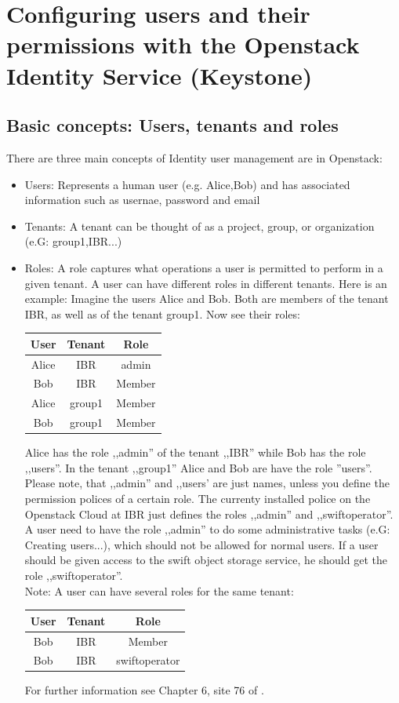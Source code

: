 \documentclass[a4paper,ngerman,bibtotocliststotoc]{scrartcl}
\begin{document}
\section{Configuring users and their permissions with the Openstack
  Identity Service (Keystone)}

\subsection{Basic concepts: Users, tenants and roles}
\label{sec:basic-conc-users}
There are three main concepts of Identity user management are in Openstack:
\begin{itemize}
\item Users: Represents a human user (e.g. Alice,Bob) and has associated
  information such as usernae, password and email
\item Tenants: A tenant can be thought of as a project, group, or
  organization (e.G: group1,IBR...) 
\item Roles: A role captures what operations a user is permitted to
  perform in a given tenant.  A user can have different roles in
  different tenants. Here is an example: Imagine the users Alice and
  Bob. Both are members of the tenant IBR, as well as of the tenant
  group1. Now see their roles:\\
  \begin{center}
  \begin{tabular}{c|c|c}
    User & Tenant & Role  \tabularnewline \hline
    Alice &IBR& admin \tabularnewline \hline
    Bob &IBR&Member  \tabularnewline \hline
    Alice&group1&Member \tabularnewline \hline
    Bob&group1&Member
  \end{tabular}  
  \end{center}
  Alice has the role ,,admin'' of the  tenant ,,IBR'' while
  Bob has the role ,,users''. In the tenant ,,group1'' Alice and Bob
  are have the role ''users''. Please note, that ,,admin'' and
  ,,users' are just names, unless you define the permission polices of a
  certain role. The currenty installed police on the Openstack Cloud
  at IBR just defines the roles ,,admin'' and ,,swiftoperator''.
  A user need to have the role ,,admin'' to do some administrative tasks (e.G: Creating
  users...), which should not be allowed for normal users. If a user
  should be given access to the swift object storage service, he
  should get the role ,,swiftoperator''.\\
Note: A user can have several roles for the same tenant:
\begin{center}
  \begin{tabular}{c|c|c}
    User & Tenant & Role  \tabularnewline \hline
    Bob &IBR&Member \tabularnewline \hline
    Bob & IBR&swiftoperator%
  \end{tabular}  
  \end{center}
 For further information see Chapter 6, site 76 of \cite{computeadmin}.%
\end{itemize}
\end{document}
